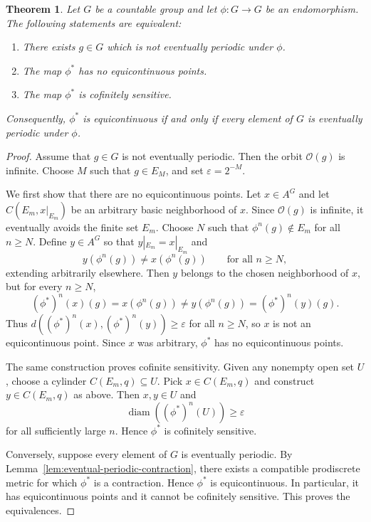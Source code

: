 \documentclass[12pt,a4paper]{article}
\newtheorem{theorem}{Theorem}[section]
\theoremstyle{definition}
\theoremstyle{remark}
\newcommand{\Orb}{\mathcal{O}}
\newcommand{\diam}{\operatorname{diam}}
\begin{document}
\begin{theorem}\label{thm:general-dichotomy}
Let $G$ be a countable group and let $\phi:G\to G$ be an endomorphism. The following statements are equivalent:
\begin{enumerate}
\item There exists $g\in G$ which is not eventually periodic under $\phi$.
\item The map $\phi^*$ has no equicontinuous points.
\item The map $\phi^*$ is cofinitely sensitive.
\end{enumerate}
Consequently, $\phi^*$ is equicontinuous if and only if every element of $G$ is eventually periodic under $\phi$.
\end{theorem}

\begin{proof}
Assume that $g\in G$ is not eventually periodic. Then the orbit $\Orb(g)$ is infinite. Choose $M$ such that $g\in E_M$, and set $\varepsilon=2^{-M}$.

We first show that there are no equicontinuous points. Let $x\in A^G$ and let $C(E_m,x|_{E_m})$ be an arbitrary basic neighborhood of $x$. Since $\Orb(g)$ is infinite, it eventually avoids the finite set $E_m$. Choose $N$ such that $\phi^n(g)\notin E_m$ for all $n\geq N$. Define $y\in A^G$ so that $y|_{E_m}=x|_{E_m}$ and
\[
y(\phi^n(g))\neq x(\phi^n(g))
\qquad\text{for all }n\geq N,
\]
extending arbitrarily elsewhere. Then $y$ belongs to the chosen neighborhood of $x$, but for every $n\geq N$,
\[
(\phi^*)^n(x)(g)=x(\phi^n(g))\neq y(\phi^n(g))=(\phi^*)^n(y)(g).
\]
Thus $d((\phi^*)^n(x),(\phi^*)^n(y))\geq \varepsilon$ for all $n\geq N$, so $x$ is not an equicontinuous point. Since $x$ was arbitrary, $\phi^*$ has no equicontinuous points.

The same construction proves cofinite sensitivity. Given any nonempty open set $U$, choose a cylinder $C(E_m,q)\subseteq U$. Pick $x\in C(E_m,q)$ and construct $y\in C(E_m,q)$ as above. Then $x,y\in U$ and
\[
\diam((\phi^*)^n(U))\geq \varepsilon
\]
for all sufficiently large $n$. Hence $\phi^*$ is cofinitely sensitive.

Conversely, suppose every element of $G$ is eventually periodic. By Lemma~\ref{lem:eventual-periodic-contraction}, there exists a compatible prodiscrete metric for which $\phi^*$ is a contraction. Hence $\phi^*$ is equicontinuous. In particular, it has equicontinuous points and it cannot be cofinitely sensitive. This proves the equivalences.
\end{proof}
\end{document}
